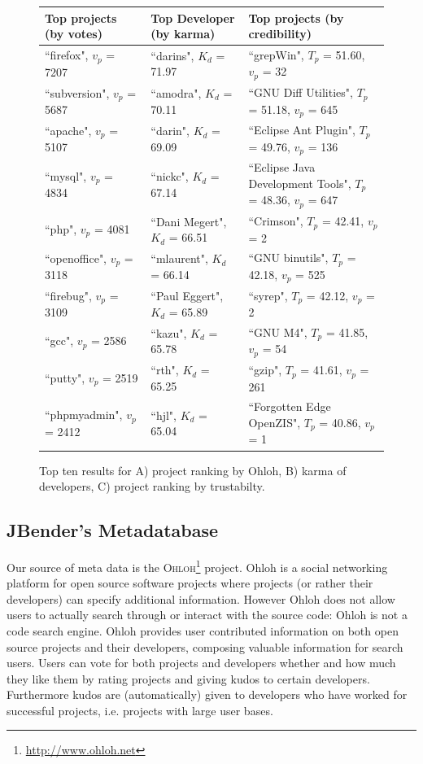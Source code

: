\begin{figure}
{\small
  \centering
\begin{tabular}{ l | l | l }%
\textbf{Top projects (by votes)} & \textbf{Top Developer (by karma)} & \textbf{Top projects (by credibility)}
\\\hline
``firefox", $v_p$ = 7207 & ``darins", $K_{d}$ = 71.97 & ``grepWin", $T_{p}$ = 51.60, $v_p$ = 32
\\%
``subversion", $v_p$ = 5687 & ``amodra", $K_{d}$ = 70.11 & ``GNU Diff Utilities", $T_{p}$ = 51.18, $v_p$ = 645
\\%
``apache", $v_p$ = 5107 & ``darin", $K_{d}$ = 69.09 & ``Eclipse Ant Plugin", $T_{p}$ = 49.76, $v_p$ = 136
\\%
``mysql", $v_p$ = 4834 & ``nickc", $K_{d}$ = 67.14 & ``Eclipse Java Development Tools", $T_{p}$ = 48.36, $v_p$ = 647
\\%
``php", $v_p$ = 4081 & ``Dani Megert", $K_{d}$ = 66.51 & ``Crimson", $T_{p}$ = 42.41, $v_p$ = 2
\\%
``openoffice", $v_p$ = 3118 & ``mlaurent", $K_{d}$ = 66.14 & ``GNU binutils", $T_{p}$ = 42.18, $v_p$ = 525
\\%
``firebug", $v_p$ = 3109 & ``Paul Eggert", $K_{d}$ = 65.89 & ``syrep", $T_{p}$ = 42.12, $v_p$ = 2
\\%
``gcc", $v_p$ = 2586 & ``kazu", $K_{d}$ = 65.78 & ``GNU M4", $T_{p}$ = 41.85, $v_p$ = 54
\\%
``putty", $v_p$ = 2519 & ``rth", $K_{d}$ = 65.25 & ``gzip", $T_{p}$ = 41.61, $v_p$ = 261
\\%
``phpmyadmin", $v_p$ = 2412 & ``hjl", $K_{d}$ = 65.04 & ``Forgotten Edge OpenZIS", $T_{p}$ = 40.86, $v_p$ = 1
\\%
\end{tabular}
\caption{
{\small
Top ten results for A) project ranking by Ohloh, B) karma of developers, C) project ranking by trustabilty.
}}
\label{fig:table}
}
\end{figure}

\subsection{JBender's Metadatabase}
Our source of meta data is the \textsc{Ohloh}\footnote{\url{http://www.ohloh.net}} project. Ohloh is a social networking platform for open source software projects where projects (or rather their developers) can specify additional information. However Ohloh does not allow users to actually search through or interact with the source code: Ohloh is not a code search engine. Ohloh provides user contributed information on both open source projects and their developers, composing valuable information for search users. Users can vote for both projects and developers whether and how much they like them by rating projects and giving kudos to certain developers. Furthermore kudos are (automatically) given to developers who have worked for successful projects, i.e. projects with large user bases. 

